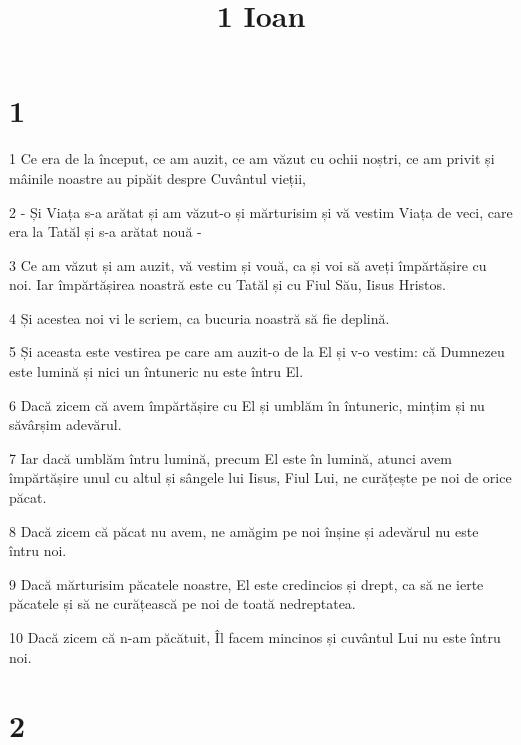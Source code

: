 

\title{1 Ioan}


\chapter{1}

\par 1 Ce era de la început, ce am auzit, ce am văzut cu ochii noștri, ce am privit și mâinile noastre au pipăit despre Cuvântul vieții,
\par 2 - Și Viața s-a arătat și am văzut-o și mărturisim și vă vestim Viața de veci, care era la Tatăl și s-a arătat nouă -
\par 3 Ce am văzut și am auzit, vă vestim și vouă, ca și voi să aveți împărtășire cu noi. Iar împărtășirea noastră este cu Tatăl și cu Fiul Său, Iisus Hristos.
\par 4 Și acestea noi vi le scriem, ca bucuria noastră să fie deplină.
\par 5 Și aceasta este vestirea pe care am auzit-o de la El și v-o vestim: că Dumnezeu este lumină și nici un întuneric nu este întru El.
\par 6 Dacă zicem că avem împărtășire cu El și umblăm în întuneric, mințim și nu săvârșim adevărul.
\par 7 Iar dacă umblăm întru lumină, precum El este în lumină, atunci avem împărtășire unul cu altul și sângele lui Iisus, Fiul Lui, ne curățește pe noi de orice păcat.
\par 8 Dacă zicem că păcat nu avem, ne amăgim pe noi înșine și adevărul nu este întru noi.
\par 9 Dacă mărturisim păcatele noastre, El este credincios și drept, ca să ne ierte păcatele și să ne curățească pe noi de toată nedreptatea.
\par 10 Dacă zicem că n-am păcătuit, Îl facem mincinos și cuvântul Lui nu este întru noi.

\chapter{2}

